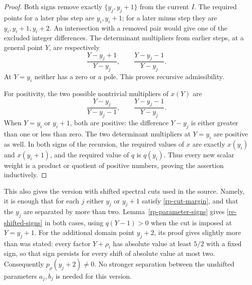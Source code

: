 \begin{proof}
Both signs remove exactly \(\{y_j,y_j+1\}\) from the
current \(I\).  The required points for a later plus step are
\(y_i,y_i+1\); for a later minus step they are
\(y_i,y_i+1,y_i+2\).  An intersection with a removed pair
would give one of the excluded integer differences.
The determinant multipliers from earlier steps, at a general
point \(Y\), are respectively
\[
 \frac{Y-y_j+1}{Y-y_j},\qquad
 \frac{Y-y_j-1}{Y-y_j}.
\]
At \(Y=y_i\) neither has a zero or a pole.  This proves
recursive admissibility.

For positivity, the two possible nontrivial multipliers of
\(x(Y)\) are
\[
 \frac{Y-y_j}{Y-y_j-1},\qquad
 \frac{Y-y_j-1}{Y-y_j}.
\]
When \(Y=y_i\) or \(y_i+1\), both are positive: the difference
\(Y-y_j\) is either greater than one or less than zero.
The two determinant multipliers at \(Y=y_i\) are positive
as well.  In both signs of the recursion, the required values
of \(x\) are exactly \(x(y_i)\) and \(x(y_i+1)\), and the
required value of \(q\) is \(q(y_i)\).
Thus every new scalar weight is a product or quotient of
positive numbers, proving the assertion inductively.
\end{proof}

This also gives the version with shifted spectral cuts used
in the source.  Namely, it is enough that for each \(j\)
either \(y_j\) or \(y_j+1\) satisfy
\eqref{rp-cut-margin}, and that the \(y_j\) are separated
by more than two.  Lemma~\ref{rp-parameter-signs} gives
\eqref{re-shifted-signs} in both cases, using \(q(Y-1)>0\)
when the cut is imposed at \(Y=y_j+1\).
For the additional domain point \(y_j+2\), its proof gives
slightly more than was stated: every factor \(Y+\rho_i\)
has absolute value at least \(5/2\) with a fixed sign,
so that sign persists for every shift of absolute value at
most two.  Consequently \(p_\rho(y_j+2)\ne0\).
No stronger separation between the unshifted parameters
\(a_j,b_j\) is needed for this version.

